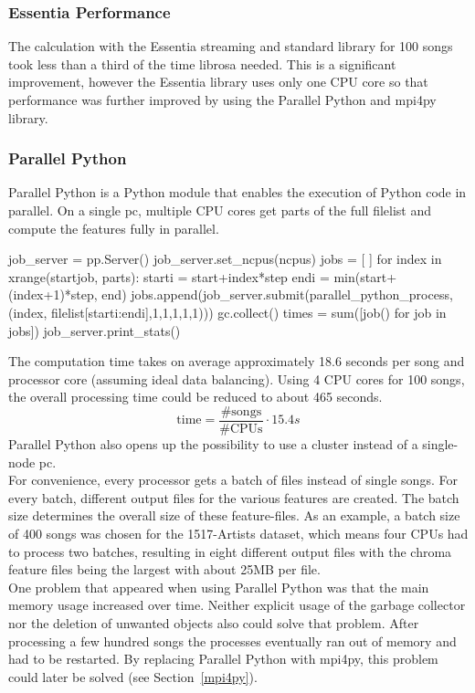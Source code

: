 \subsubsection{Essentia Performance}

The calculation with the Essentia streaming and standard library for 100 songs took less than a third of the time librosa needed. This is a significant improvement, however the Essentia library uses only one CPU core so that performance was further improved by using the Parallel Python and mpi4py library.

\subsubsection{Parallel Python}

Parallel Python is a Python module that enables the execution of Python code in parallel. On a single pc, multiple CPU cores get parts of the full filelist and compute the features fully in parallel.
\begin{pythonCode}[frame=single,label={lst:pp},caption={Parallel Python},captionpos=b]
job_server = pp.Server()
job_server.set_ncpus(ncpus)
jobs = [ ]
for index in xrange(startjob, parts):
	starti = start+index*step
	endi = min(start+(index+1)*step, end)
	jobs.append(job_server.submit(parallel_python_process, (index, filelist[starti:endi],1,1,1,1,1)))
	gc.collect()
times = sum([job() for job in jobs])
job_server.print_stats()
\end{pythonCode}
The computation time takes on average approximately 18.6 seconds per song and processor core (assuming ideal data balancing). Using 4 CPU cores for 100 songs, the overall processing time could be reduced to about 465 seconds. 
\begin{equation} \label{eq:parallelp}
\text{time} = \frac{\#\text{songs}}{\#\text{CPUs}} \cdot 15.4s
\end{equation}
Parallel Python also opens up the possibility to use a cluster instead of a single-node pc.\\
For convenience, every processor gets a batch of files instead of single songs. For every batch, different output files for the various features are created. The batch size determines the overall size of these feature-files. As an example, a batch size of 400 songs was chosen for the 1517-Artists dataset, which means four CPUs had to process two batches, resulting in eight different output files with the chroma feature files being the largest with about 25MB per file.\\
One problem that appeared when using Parallel Python was that the main memory usage increased over time. Neither explicit usage of the garbage collector nor the deletion of unwanted objects also could solve that problem. After processing a few hundred songs the processes eventually ran out of memory and had to be restarted. By replacing Parallel Python with mpi4py, this problem could later be solved (see Section~\ref{mpi4py}). 


